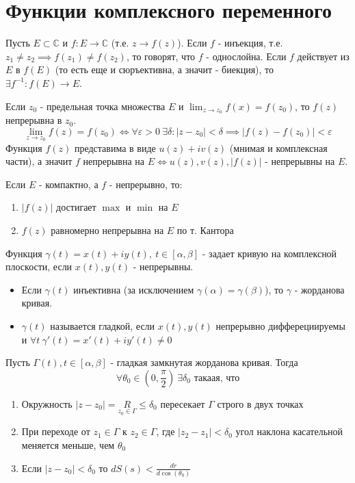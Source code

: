 \section{Функции комплексного переменного}
Пусть $E \subset \mathbb{C}$ и $f: E \to \mathbb{C}$ (т.е. $z \to f(z)$).
Если $f$ - инъекция, т.е. $z_1 \neq z_2 \implies f(z_1) \neq f(z_2)$, то говорят, что $f$ - однослойна.
Если $f$ действует из $E$ в $f(E)$ (то есть еще и сюръективна, а значит - биекция), то $\exists f^{-1}: f(E) \to E$.

\begin{definition}
    Если $z_0$ - предельная точка множества $E$ и $\lim_{z \to z_0}f(x) = f(z_0)$, то $f(z)$ непрерывна в $z_0$.
    \[\lim_{z \to z_0}f(z) = f(z_0) \iff \forall \varepsilon > 0 \ \exists \delta: \left| z - z_0 \right| < \delta \implies \left| f(z) - f(z_0)\right| < \varepsilon\]
    Функция $f(z)$ представима в виде $u(z) + iv(z)$ (мнимая и комплексная части), а значит $f$ непрерывна на $E \iff u(z), v(z), \left| f(z) \right| $ - непрерывны на $E$.
\end{definition}

Если $E$ - компактно, а $f$ - непрерывно, то:
\begin{enumerate}
    \item $\left| f(z) \right|$ достигает $\max$ и $\min$ на $E$
    \item $f(z)$ равномерно непрерывна на $E$ по т. Кантора
\end{enumerate}

\begin{definition}
Функция $\gamma(t) = x(t) + iy(t), \ t\in [\alpha, \beta]$ - задает кривую на комплексной плоскости, если $x(t), y(t)$ - непрерывны.
    
\begin{itemize}
    \item Если $\gamma(t)$ инъективна (за исключением $\gamma(\alpha) = \gamma(\beta)$), то $\gamma$ - жорданова кривая.
    \item $\gamma(t)$ называется гладкой, если $x(t), y(t)$ непрерывно дифферециируемы и $\forall t \ \gamma'(t) = x'(t) + iy'(t) \neq 0$
\end{itemize}
\end{definition}

\begin{theorem*}
    Пусть $\Gamma(t), t \in [\alpha, \beta]$ - гладкая замкнутая жорданова кривая. Тогда
    \[\forall \theta_0 \in (0, \frac{\pi}{2}) \ \exists \delta_0 \text{ такаая, что}\]
    \begin{enumerate}
        \item Окружность $\left| z - z_0 \right| = \underset{z_0 \in \Gamma}{R} \leq \delta_0$ пересекает $\Gamma$ строго в двух точках
        \item При переходе от $z_1 \in \Gamma$ к $z_2 \in \Gamma$, где $\left| z_2 - z_1 \right| < \delta_0$ угол наклона касательной меняется меньше, чем $\theta_0$
        \item Если $\left| z - z_0 \right| < \delta_0$ то $dS(s) < \frac{dr}{d\cos(\theta_0)}$
    \end{enumerate}
\end{theorem*}

